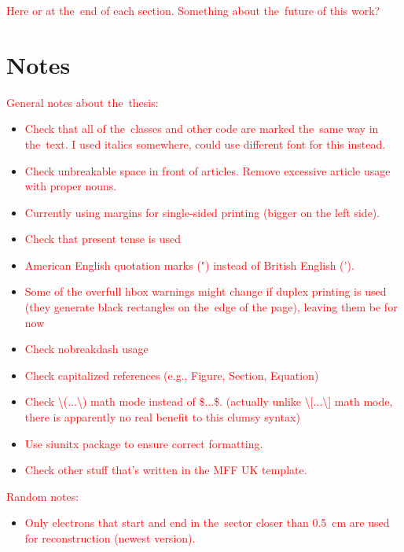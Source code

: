 	\textcolor{red}{Here or at the~end of each section. Something about the~future of this work?}
	
	\section*{Notes}
		\textcolor{red}{General notes about the~thesis:}
		\begin{itemize}
			\item \textcolor{red}{Check that all of the~classes and other code are marked the~same way in the~text. I used italics somewhere, could use different font for this instead.}
			\item \textcolor{red}{Check unbreakable space in front of articles. Remove excessive article usage with proper nouns.}
			\item \textcolor{red}{Currently using margins for single-sided printing (bigger on the left side).}
			\item \textcolor{red}{Check that present tense is used}
			\item \textcolor{red}{American English quotation marks (") instead of British English (').}
			\item \textcolor{red}{Some of the overfull hbox warnings might change if duplex printing is used (they generate black rectangles on the~edge of the page), leaving them be for now}
			\item \textcolor{red}{Check nobreakdash usage}
			\item \textcolor{red}{Check capitalized references (e.g., Figure, Section, Equation)}
			\item \textcolor{red}{Check \textbackslash(...\textbackslash) math mode instead of \$...\$. (actually unlike \textbackslash[...\textbackslash] math mode, there is apparently no real benefit to this clumsy syntax)}
			\item \textcolor{red}{Use siunitx package to ensure correct formatting.}
			\item \textcolor{red}{Check other stuff that's written in the MFF UK template.}
		\end{itemize}
		\textcolor{red}{Random notes:}
		\begin{itemize}
			\item \textcolor{red}{Only electrons that start and end in the~sector closer than 0.5~cm are used for reconstruction (newest version).}
		\end{itemize}
		
